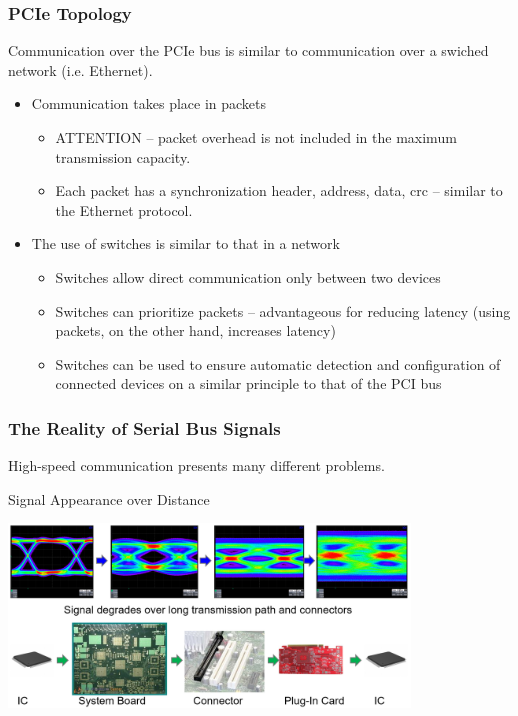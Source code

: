 \documentclass{beamer}
\begin{document}
\begin{frame}
\frametitle{PCIe Topology}

Communication over the PCIe bus is similar to communication over a swiched network (i.e. Ethernet).
\begin{itemize}
\item Communication takes place in packets
\begin{itemize}
\item ATTENTION -- packet overhead is not included in the maximum transmission capacity.
\item Each packet has a synchronization header, address, data, crc -- similar to the Ethernet protocol.
\end{itemize}
\item The use of switches is similar to that in a network
\begin{itemize}
\item Switches allow direct communication only between two devices
\item Switches can prioritize packets -- advantageous for reducing latency (using packets, on the other hand, increases latency)
\item Switches can be used to ensure automatic detection and configuration of connected devices on a similar principle to that of the PCI bus
\end{itemize}
\end{itemize}

\end{frame}


\begin{frame}
\frametitle{The Reality of Serial Bus Signals}

High-speed communication presents many different problems.

Signal Appearance over Distance

\begin{center}
\includegraphics[width=0.8\textwidth]{fig/signals.png}
\end{center}

\end{frame}
\end{document}
